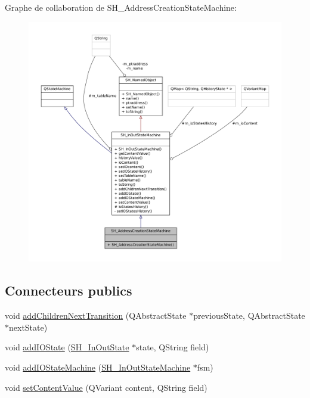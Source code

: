 Graphe de collaboration de S\-H\-\_\-\-Address\-Creation\-State\-Machine\-:\nopagebreak
\begin{figure}[H]
\begin{center}
\leavevmode
\includegraphics[width=350pt]{classSH__AddressCreationStateMachine__coll__graph}
\end{center}
\end{figure}
\subsection*{Connecteurs publics}
\begin{DoxyCompactItemize}
\item 
void \hyperlink{classSH__InOutStateMachine_a689e5513ef6ef3fc1598efacd413372e}{add\-Children\-Next\-Transition} (Q\-Abstract\-State $\ast$previous\-State, Q\-Abstract\-State $\ast$next\-State)
\item 
void \hyperlink{classSH__InOutStateMachine_ad6b778d052f741daee720c047059ce0e}{add\-I\-O\-State} (\hyperlink{classSH__InOutState}{S\-H\-\_\-\-In\-Out\-State} $\ast$state, Q\-String field)
\item 
void \hyperlink{classSH__InOutStateMachine_a56954869252c7f1980abf37df9919b5e}{add\-I\-O\-State\-Machine} (\hyperlink{classSH__InOutStateMachine}{S\-H\-\_\-\-In\-Out\-State\-Machine} $\ast$fsm)
\item 
void \hyperlink{classSH__InOutStateMachine_aa2766b7a7ba39c35a10df7fc0c151b4f}{set\-Content\-Value} (Q\-Variant content, Q\-String field)
\end{DoxyCompactItemize}
